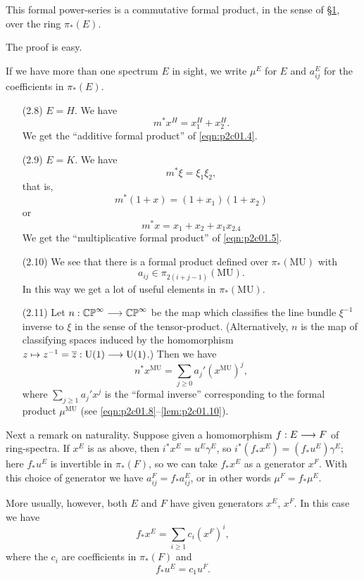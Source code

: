 \documentclass[../main]{subfiles}
\begin{document}
\begin{lemma}
This formal power-series is a commutative formal product, in the sense of \hyperref[sec:p2c1]{\S 1}, over the ring $\pi_\ast(E)$. 
\end{lemma}

The proof is easy.

If we have more than one spectrum $E$ in sight, we write $\mu^E$ for $E$ and $a_{ij}^E$ for the coefficients in $\pi_\ast(E)$. 

\begin{examples}\label{ex:p2c02.8}
\begin{enumerate}
    \item[(2.8)] $E = H$. We have $$m^\ast x^H = x_1^H + x_2^H.$$ We get the ``additive formal product'' of \eqref{eqn:p2c01.4}.
    \item[(2.9)] $E = K$. We have $$m^\ast \xi = \xi_1 \xi_2,$$ that is, $$m^\ast(1 + x) = (1 + x_1) (1 + x_2)$$ or $$m^\ast x = x_1 + x_2 + x_1 x_2.4$$ We get the ``multiplicative formal product'' of \eqref{eqn:p2c01.5}.
    \item[(2.10)] We see that there is a formal product defined over $\pi_\ast(\mathrm{MU})$ with $$a_{ij} \in \pi_{2(i + j - 1)} (\mathrm{MU}).$$ In this way we get a lot of useful elements in $\pi_\ast(\mathrm{MU})$.
    \item[(2.11)] Let $n : \mathbb {CP}^\infty \overset{}{\longrightarrow} \mathbb {CP}^\infty$ be the map which classifies the line bundle $\xi^{-1}$ inverse to $\xi$ in the sense of the tensor-product. (Alternatively, $n$ is the map of classifying spaces induced by the homomorphism $z \mapsto z^{-1} = \overline z : \mathrm{U}(1) \overset{}{\longrightarrow} \mathrm{U}(1)$.) Then we have $$n^\ast x^{\mathrm{MU}} = \sum_{j \ge 0} a_j' (x^{\mathrm{MU}})^j,$$ where $\displaystyle \sum_{j \ge 1} a_j' x^j$ is the ``formal inverse'' corresponding to the formal product $\mu^{\mathrm{MU}}$ (see \eqref{eqn:p2c01.8}--\eqref{lem:p2c01.10}).
\end{enumerate}
\end{examples}

Next a remark on naturality. Suppose given a homomorphism $f : E \overset{}{\longrightarrow} F$ of ring-spectra. If $x^E$ is as above, then $i^\ast x^E = u^E \gamma^E$, so $i^\ast(f_\ast x^E) = (f_\ast u^E) \gamma^E$; here $f_\ast u^E$ is invertible in $\pi_\ast(F)$, so we can take $f_\ast x^E$ as a generator $x^F$. With this choice of generator we have $a_{ij}^F = f_\ast a_{ij}^E$, or in other words $\mu^F = f_\ast \mu^E$. 

More usually, however, both $E$ and $F$ have given generators $x^E$, $x^F$. In this case we have $$f_\ast x^E = \sum_{i \ge 1} c_i (x^F)^i,$$ where the $c_i$ are coefficients in $\pi_\ast(F)$ and
\begin{equation}
\tag{2.12}
\label{eqn:p2c02.12}
f_\ast u^E = c_1 u^F.
\end{equation}
\end{document}
